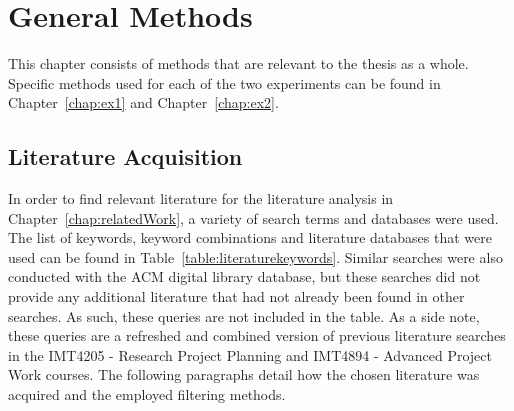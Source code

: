 \chapter{General Methods} \label{chap:generalmethods}
This chapter consists of methods that are relevant to the thesis as a whole. Specific methods used for each of the two experiments can be found in Chapter~\ref{chap:ex1} and Chapter~\ref{chap:ex2}. 

\section{Literature Acquisition}
In order to find relevant literature for the literature analysis in Chapter~\ref{chap:relatedWork}, a variety of search terms and databases were used. The list of keywords, keyword combinations and literature databases that were used can be found in Table~\ref{table:literaturekeywords}. 
Similar searches were also conducted with the ACM digital library database, but these searches did not provide any additional literature that had not already been found in other searches. As such, these queries are not included in the table. As a side note, these queries are a refreshed and combined version of previous literature searches in the IMT4205 - Research Project Planning and IMT4894 - Advanced Project Work courses. The following paragraphs detail how the chosen literature was acquired and the employed filtering methods. 

